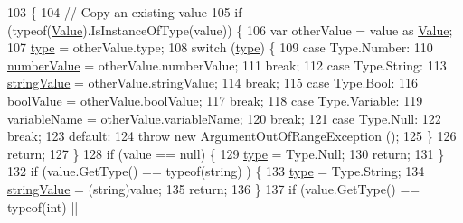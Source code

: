 \begin{DoxyCode}
103         \{
104             \textcolor{comment}{// Copy an existing value}
105             \textcolor{keywordflow}{if} (typeof(\hyperlink{a00086_a7d2db75682c57463bf43c13499991ad4}{Value}).IsInstanceOfType(value)) \{
106                 var otherValue = value as \hyperlink{a00086_a7d2db75682c57463bf43c13499991ad4}{Value};
107                 \hyperlink{a00086_a6d5820fafa766911b9da84d1ed33e51a}{type} = otherValue.type;
108                 \textcolor{keywordflow}{switch} (\hyperlink{a00086_a6d5820fafa766911b9da84d1ed33e51a}{type}) \{
109                 \textcolor{keywordflow}{case} Type.Number:
110                     \hyperlink{a00086_ae1892c1c7a8177537d1caa39a2e51da6}{numberValue} = otherValue.numberValue;
111                     \textcolor{keywordflow}{break};
112                 \textcolor{keywordflow}{case} Type.String:
113                     \hyperlink{a00086_add1b07146f1a9e4b655b33c93d07dff9}{stringValue} = otherValue.stringValue;
114                     \textcolor{keywordflow}{break};
115                 \textcolor{keywordflow}{case} Type.Bool:
116                     \hyperlink{a00086_acb140e3466e132528409d4c441fd67da}{boolValue} = otherValue.boolValue;
117                     \textcolor{keywordflow}{break};
118                 \textcolor{keywordflow}{case} Type.Variable:
119                     \hyperlink{a00086_a8ee2b09b7d28eaf97bf63c74d0023bfd}{variableName} = otherValue.variableName;
120                     \textcolor{keywordflow}{break};
121                 \textcolor{keywordflow}{case} Type.Null:
122                     \textcolor{keywordflow}{break};
123                 \textcolor{keywordflow}{default}:
124                     \textcolor{keywordflow}{throw} \textcolor{keyword}{new} ArgumentOutOfRangeException ();
125                 \}
126                 \textcolor{keywordflow}{return};
127             \}
128             \textcolor{keywordflow}{if} (value == null) \{
129                 \hyperlink{a00086_a6d5820fafa766911b9da84d1ed33e51a}{type} = Type.Null;
130                 \textcolor{keywordflow}{return};
131             \}
132             \textcolor{keywordflow}{if} (value.GetType() == typeof(\textcolor{keywordtype}{string}) ) \{
133                 \hyperlink{a00086_a6d5820fafa766911b9da84d1ed33e51a}{type} = Type.String;
134                 \hyperlink{a00086_add1b07146f1a9e4b655b33c93d07dff9}{stringValue} = (string)value;
135                 \textcolor{keywordflow}{return};
136             \}
137             \textcolor{keywordflow}{if} (value.GetType() == typeof(\textcolor{keywordtype}{int}) ||

\end{DoxyCode}
